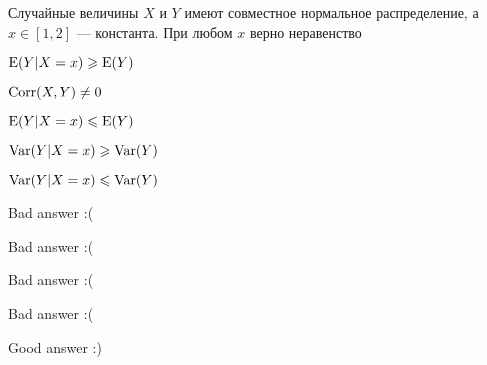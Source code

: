 
\begin{question}
Случайные величины \(X\) и \(Y\) имеют совместное нормальное
распределение, а \(x\in[1,2]\) --- константа. При любом \(x\) верно
неравенство
\begin{answerlist}
  \item \(\operatorname{E}(Y|X=x)\geqslant \operatorname{E}(Y)\)
  \item \(\operatorname{Corr}(X,Y)\ne0\)
  \item \(\operatorname{E}(Y|X=x)\leqslant \operatorname{E}(Y)\)
  \item \(\operatorname{Var}(Y|X=x)\geqslant \operatorname{Var}(Y)\)
  \item \(\operatorname{Var}(Y|X=x)\leqslant \operatorname{Var}(Y)\)
\end{answerlist}
\end{question}

\begin{solution}
\begin{answerlist}
  \item Bad answer :(
  \item Bad answer :(
  \item Bad answer :(
  \item Bad answer :(
  \item Good answer :)
\end{answerlist}
\end{solution}

